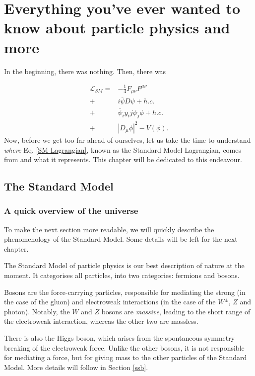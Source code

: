 \documentclass[10pt,a4paper]{book}
\begin{document}
\chapter[Theory Introduction]{Everything you've ever wanted to know about particle physics and more}

In the beginning, there was nothing. Then, there was 

\begin{equation}
\begin{split}
\mathcal{L}_{SM}=& -\frac{1}{4}F_{\mu\nu}F^{\mu\nu}\\ +& i\overline{\psi}D\psi + h.c.\\ +& \overline{\psi}_i y_ij \psi_j \phi + h.c.\\ +& |D_\mu \phi|^2 - V(\phi).
\end{split}
\label{SM Lagrangian}
\end{equation}
Now, before we get too far ahead of ourselves, let us take the time to understand \emph{where} Eq. \ref{SM Lagrangian}, known as the Standard Model Lagrangian, comes from and what it represents. This chapter will be dedicated to this endeavour.

\section{The Standard Model}

\subsection{A quick overview of the universe}

To make the next section more readable, we will quickly describe the phenomenology of the Standard Model. Some details will be left for the next chapter. 

The Standard Model of particle physics is our best description of nature at the moment. It categorises all particles, into two categories: fermions and bosons. 

Bosons are the force-carrying particles, responsible for mediating the strong (in the case of the gluon) and electroweak interactions (in the case of the $W^\pm$, $Z$ and photon). Notably, the $W$ and $Z$ bosons are \emph{massive}, leading to the short range of the electroweak interaction, whereas the other two are massless. 

There is also the Higgs boson, which arises from the spontaneous symmetry breaking of the electroweak force. Unlike the other bosons, it is not responsible for mediating a force, but for giving mass to the other particles of the Standard Model. More details will follow in Section \ref{ssb}.
\end{document}
